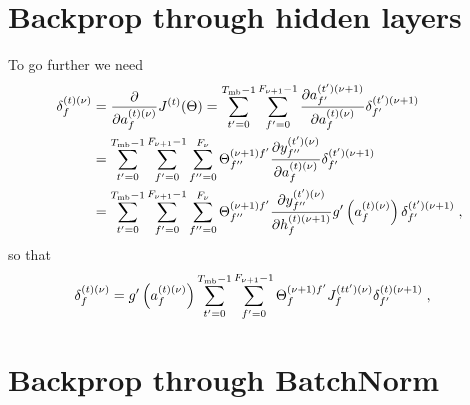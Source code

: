 \begin{subappendices}
\section{Backprop through hidden layers} \label{sec:appenbplayers}

To go further we need
\begin{align}
\delta^{(t)(\nu)}_f&= \frac{\partial }{\partial a_{f}^{(t)(\nu)}}J^{(t)}(\Theta)=
%
\sum_{t'=0}^{T_{{\rm mb}}-1}\sum_{f'=0}^{F_{\nu+1}-1}
%
 \frac{\partial a_{f'}^{(t')(\nu+1)}}{\partial a_{f}^{(t)(\nu)}} \delta^{(t')(\nu+1)}_{f'}\notag\\
%
&=\sum_{t'=0}^{T_{{\rm mb}}-1}\sum_{f'=0}^{F_{\nu+1}-1}\sum^{F_\nu}_{f''=0}\Theta^{(\nu+1)f'}_{f''}
%
\frac{\partial y^{(t')(\nu)}_{f''} }{\partial a_{f}^{(t)(\nu)}} \delta^{(t')(\nu+1)}_{f'}\notag\\
%
&=\sum_{t'=0}^{T_{{\rm mb}}-1}\sum_{f'=0}^{F_{\nu+1}-1}\sum^{F_\nu}_{f''=0}\Theta^{(\nu+1)f'}_{f''}
%
\frac{\partial y^{(t')(\nu)}_{f''} }{\partial h_{f}^{(t)(\nu+1)}}
%
g'\left(a_{f}^{(t)(\nu)}\right) \delta^{(t')(\nu+1)}_{f'}\;,
\end{align}
so that
\begin{align}
\delta^{(t)(\nu)}_f&=g'\left(a_{f}^{(t)(\nu)}\right)
%
\sum_{t'=0}^{T_{{\rm mb}}-1}\sum_{f'=0}^{F_{\nu+1}-1}\Theta^{(\nu+1)f'}_{f}J^{(tt')(\nu)}_{f} \delta^{(t)(\nu+1)}_{f'}\;,
\end{align}


\section{Backprop through BatchNorm} \label{sec:appenbatchnorm}



\end{subappendices}

